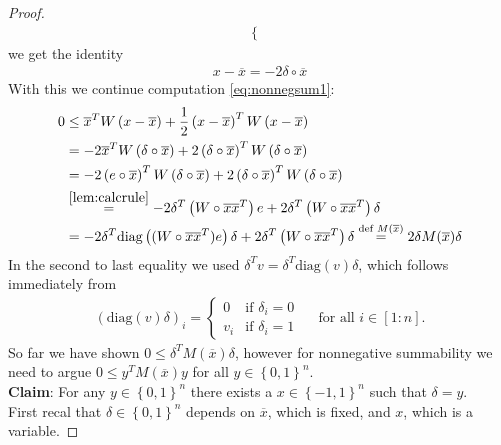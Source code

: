 \documentclass[12pt,a4paper]{article}
\theoremstyle{mythm}
\begin{document}
\begin{proof}
\begin{align*}
\begin{cases}
\end{cases}
\end{align*} 
we get the identity 
\begin{align*}
x - \overline{ x } = -2 \delta \circ \overline{ x } 
\end{align*} 
With this we continue computation \ref{eq:nonnegsum1}:
\begin{align*}
0 
&\leq \overline{ x } ^T W \left( x- \overline{ x }  \right) + \frac{ 1 }{ 2 } \left( x - \overline{ x }  \right) ^T W \left( x - \overline{ x }  \right) \\
&= -2 \overline{ x } ^T W \left( \delta \circ \overline{ x }  \right) + 2 \left( \delta \circ \overline{ x }  \right) ^T W \left( \delta \circ \overline{ x }  \right) \\
&= -2 \left( e \circ \overline{ x } \right)  ^T W \left( \delta \circ \overline{ x }  \right) + 2 \left( \delta \circ \overline{ x }  \right) ^T W \left( \delta \circ \overline{ x }  \right) \\
&\overset{ \ref{lem:calcrule}  }{ =}  -2 \delta ^T \left( W \circ \overline{ x } \overline{ x } ^T \right)  e + 2 \delta ^T \left( W \circ \overline{ x } \overline{ x } ^T  \right) \delta \\
&= -2 \delta ^T \text{diag} \left( ( W \circ \overline{ x } \overline{ x } ^T ) e  \right) \delta + 2 \delta ^T \left( W \circ \overline{ x } \overline{ x } ^T  \right) \delta 
\overset{ \text{def } M ( \overline{ x }  )   }{=}  2 \delta M ( \overline{ x }  ) \delta
\end{align*} 
In the second to last equality we used $ \delta ^T v = \delta ^T \text{diag} \left( v \right) \delta $, which follows immediately from
\begin{align*}
\left(  \text{diag} (v) \delta \right) _{ i } = 
\begin{cases}
0 & \text{if } \delta _{ i } = 0 \\
v_i & \text{if } \delta _{ i } = 1
\end{cases}
\quad \text{ for all } i \in \left[ 1:n \right].
\end{align*} 
So far we have shown $ 0 \leq \delta ^T M ( \overline{ x }  ) \delta  $, however for nonnegative summability we need to argue $ 0 \leq y ^T M ( \overline{ x }
) y  $ for all $ y \in \left\{ 0,1 \right\} ^{ n }  $.\\
\textbf{Claim}: For any $ y \in \left\{ 0,1 \right\} ^{ n } $ there exists a $ x \in \left\{ -1,1 \right\} ^{ n }  $ such that $ \delta = y $. \\
First recal that $ \delta \in \left\{ 0,1 \right\} ^{ n } $ depends on $ \overline{ x }  $, which is fixed, and $ x $, which is a variable. 

\end{proof}
\end{document}
